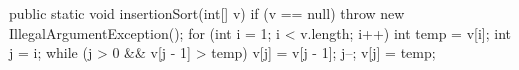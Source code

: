 \begin{unipdcode}[language=Java]
public static void insertionSort(int[] v) {
    if (v == null) throw new IllegalArgumentException();
    for (int i = 1; i < v.length; i++) {
        int temp = v[i];
        int j = i;
        while (j > 0 && v[j - 1] > temp) {
            v[j] = v[j - 1];
            j--;
        }
        v[j] = temp;
    }
}
\end{unipdcode}
